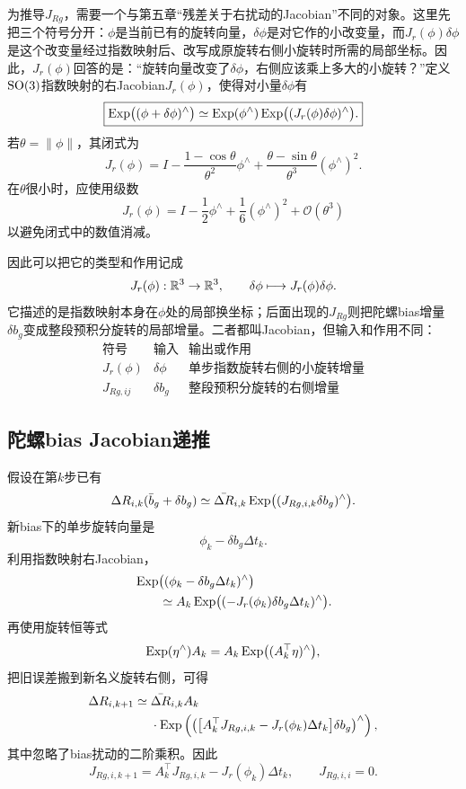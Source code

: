 为推导$J_{R g}$，需要一个与第五章“残差关于右扰动的Jacobian”不同的对象。这里先把三个符号分开：$\phi$是当前已有的旋转向量，$\delta\phi$是对它作的小改变量，而$J_r(\phi)\delta\phi$是这个改变量经过指数映射后、改写成原旋转右侧小旋转时所需的局部坐标。因此，$J_r(\phi)$回答的是：“旋转向量改变了$\delta\phi$，右侧应该乘上多大的小旋转？”定义$\operatorname{SO}(3)$指数映射的右Jacobian$J_r(\phi)$，使得对小量$\delta\phi$有
\[
\boxed{
    \operatorname{Exp}\bigl((\phi+\delta\phi)^\wedge\bigr)
    \simeq
    \operatorname{Exp}(\phi^\wedge)
    \operatorname{Exp}\bigl((J_r(\phi)\delta\phi)^\wedge\bigr).
}
\]
若$\theta=\|\phi\|$，其闭式为
\[
    J_r(\phi)
    =I-\frac{1-\cos\theta}{\theta^2}\phi^\wedge
      +\frac{\theta-\sin\theta}{\theta^3}(\phi^\wedge)^2.
\]
在$\theta$很小时，应使用级数
\[
    J_r(\phi)
    =I-\frac12\phi^\wedge
      +\frac16(\phi^\wedge)^2+\mathcal O(\theta^3)
\]
以避免闭式中的数值消减。

因此可以把它的类型和作用记成
\[
    J_r(\phi):\mathbb{R}^3\to\mathbb{R}^3,
    \qquad
    \delta\phi\longmapsto J_r(\phi)\delta\phi.
\]
它描述的是指数映射本身在$\phi$处的局部换坐标；后面出现的$J_{R g}$则把陀螺bias增量$\delta b_g$变成整段预积分旋转的局部增量。二者都叫Jacobian，但输入和作用不同：
\[
\begin{array}{c|c|c}
\text{符号} & \text{输入} & \text{输出或作用}\\ \hline
J_r(\phi) & \delta\phi & \text{单步指数旋转右侧的小旋转增量}\\
J_{R g,ij} & \delta b_g & \text{整段预积分旋转的右侧增量}
\end{array}
\]

\subsection{陀螺bias Jacobian递推}

假设在第$k$步已有
\[
    \Delta R_{i,k}(\bar b_g+\delta b_g)
    \simeq
    \bar{\Delta R}_{i,k}
    \operatorname{Exp}\bigl((J_{R g,i,k}\delta b_g)^\wedge\bigr).
\]
新bias下的单步旋转向量是
\[
    \phi_k-\delta b_g\Delta t_k.
\]
利用指数映射右Jacobian，
\[
\begin{aligned}
    &\operatorname{Exp}\bigl((\phi_k-\delta b_g\Delta t_k)^\wedge\bigr)\\
    &\qquad\simeq
    A_k
    \operatorname{Exp}\bigl((-J_r(\phi_k)\delta b_g\Delta t_k)^\wedge\bigr).
\end{aligned}
\]
再使用旋转恒等式
\[
    \operatorname{Exp}(\eta^\wedge)A_k
    =A_k\operatorname{Exp}\bigl((A_k^\top\eta)^\wedge\bigr),
\]
把旧误差搬到新名义旋转右侧，可得
\[
\begin{aligned}
    \Delta R_{i,k+1}
    \simeq{}&
    \bar{\Delta R}_{i,k}A_k\\
    &\cdot\operatorname{Exp}\left(
      \left(
        \bigl[A_k^\top J_{R g,i,k}
        -J_r(\phi_k)\Delta t_k\bigr]\delta b_g
      \right)^\wedge
    \right),
\end{aligned}
\]
其中忽略了bias扰动的二阶乘积。因此
\[
\boxed{
    J_{R g,i,k+1}
    =A_k^\top J_{R g,i,k}
    -J_r(\phi_k)\Delta t_k,
    \qquad
    J_{R g,i,i}=0.
}
\]

